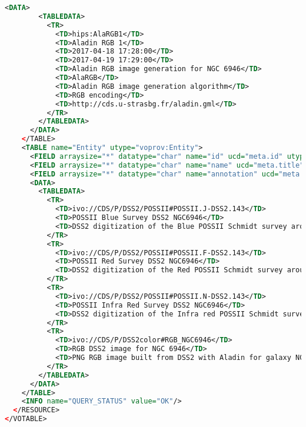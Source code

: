 \begin{lstlisting}[language=XML, caption= PROV-VOTABLE serialisation example for a Color composition Activity]
      <DATA>
        <TABLEDATA>
          <TR>
            <TD>hips:AlaRGB1</TD>
            <TD>Aladin RGB 1</TD>
            <TD>2017-04-18 17:28:00</TD>
            <TD>2017-04-19 17:29:00</TD>
            <TD>Aladin RGB image generation for NGC 6946</TD>
            <TD>AlaRGB</TD>
            <TD>Aladin RGB image generation algorithm</TD>
            <TD>RGB encoding</TD>
            <TD>http://cds.u-strasbg.fr/aladin.gml</TD>
          </TR>
        </TABLEDATA>
      </DATA>
    </TABLE>
    <TABLE name="Entity" utype="voprov:Entity">
      <FIELD arraysize="*" datatype="char" name="id" ucd="meta.id" utype="voprov:Entity.id"/>
      <FIELD arraysize="*" datatype="char" name="name" ucd="meta.title" utype="voprov:Entity.name"/>
      <FIELD arraysize="*" datatype="char" name="annotation" ucd="meta.description" utype="voprov:Entity.annotation"/>
      <DATA>
        <TABLEDATA>
          <TR>
            <TD>ivo://CDS/P/DSS2/POSSII#POSSII.J-DSS2.143</TD>
            <TD>POSSII Blue Survey DSS2 NGC6946</TD>
            <TD>DSS2 digitization of the Blue POSSII Schmidt survey around  NGC 6946</TD>
          </TR>
          <TR>
            <TD>ivo://CDS/P/DSS2/POSSII#POSSII.F-DSS2.143</TD>
            <TD>POSSII Red Survey DSS2 NGC6946</TD>
            <TD>DSS2 digitization of the Red POSSII Schmidt survey around NGC 6946</TD>
          </TR>
          <TR>
            <TD>ivo://CDS/P/DSS2/POSSII#POSSII.N-DSS2.143</TD>
            <TD>POSSII Infra Red Survey DSS2 NGC6946</TD>
            <TD>DSS2 digitization of the Infra red POSSII Schmidt survey around  NGC 6946</TD>
          </TR>
          <TR>
            <TD>ivo://CDS/P/DSS2color#RGB_NGC6946</TD>
            <TD>RGB DSS2 image for NGC 6946</TD>
            <TD>PNG RGB image built from DSS2 with Aladin for galaxy NGC 6946</TD>
          </TR>
        </TABLEDATA>
      </DATA>
    </TABLE>
    <INFO name="QUERY_STATUS" value="OK"/>
  </RESOURCE>
</VOTABLE>
\end{lstlisting}
